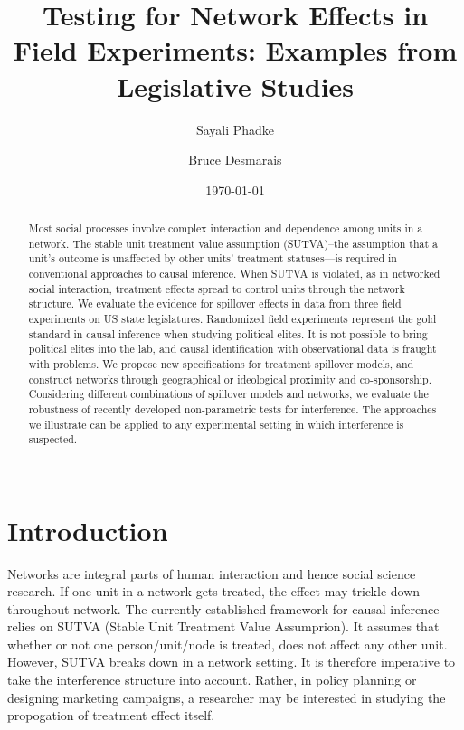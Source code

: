 \documentclass[12pt]{article}
\title{\vspace{-2cm} Testing for Network Effects in Field Experiments: Examples from Legislative Studies }
\author{ Sayali Phadke \and Bruce Desmarais} \date{\today}
\begin{document}
\maketitle




\begin{abstract}

 \noindent  Most social processes involve complex interaction and dependence among units in a network. The stable unit treatment value assumption (SUTVA)--the assumption that a unit’s outcome is unaffected by other units’ treatment statuses—is required in conventional approaches to causal inference. When SUTVA is violated, as in networked social interaction, treatment effects spread to control units through the network structure. We evaluate the evidence for spillover effects in data from three field experiments on US state legislatures. Randomized field experiments represent the gold standard in causal inference when studying political elites. It is not possible to bring political elites into the lab, and causal identification with observational data is fraught with problems. We propose new specifications for treatment spillover models, and construct networks through geographical or ideological proximity and co-sponsorship. Considering different combinations of spillover models and networks, we evaluate the robustness of recently developed non-parametric tests for interference. The approaches we illustrate can be applied to any experimental setting in which interference is suspected. \\~\\

\end{abstract}
\thispagestyle{empty}
\doublespacing
\section{Introduction}

Networks are integral parts of human interaction and hence social science research. If one unit in a network gets treated, the effect may trickle down throughout network. The currently established framework for causal inference relies on SUTVA (Stable Unit Treatment Value Assumprion). It assumes that whether or not one person/unit/node is treated, does not affect any other unit. However, SUTVA breaks down in a network setting. It is therefore imperative to take the interference structure into account. Rather, in policy planning or designing marketing campaigns, a researcher may be interested in studying the propogation of treatment effect itself.
\end{document}

